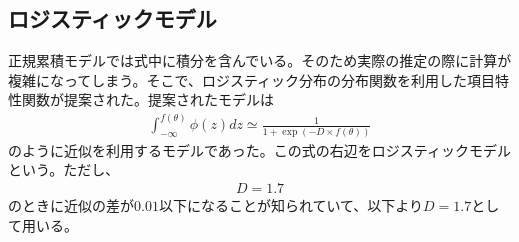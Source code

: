 \documentclass[12pt]{jarticle}
\numberwithin{equation}{subsection}
\begin{document}
\subsection{ロジスティックモデル}
正規累積モデルでは式中に積分を含んでいる。そのため実際の推定の際に計算が複雑になってしまう。そこで、ロジスティック分布の分布関数を利用した項目特性関数が提案された。提案されたモデルは
\begin{align}
  \displaystyle
  \int_{-\infty}^{f(\theta)} \phi(z)dz \simeq \frac{1}{1 + \exp(-D \times f(\theta))}
\end{align}
のように近似を利用するモデルであった。この式の右辺をロジスティックモデルという。ただし、
\begin{align}
  \displaystyle
  D = 1.7
\end{align}
のときに近似の差が$0.01$以下になることが知られていて、以下より$D = 1.7$として用いる。
\end{document}
